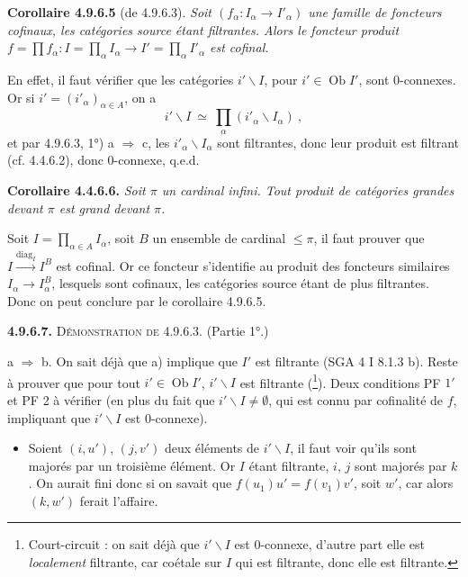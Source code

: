 \documentclass[11pt]{article}
\newcommand{\msp}[1]{\marginpar{\footnotesize [#1]}}
\newcommand{\Ob}{\operatorname{Ob}}
\begin{document}
\textbf{Corollaire 4.9.6.5} (de 4.9.6.3). \textit{Soit $(f_\alpha : I_\alpha \longrightarrow I'_\alpha)$ une famille de foncteurs cofinaux, les catégories source étant filtrantes. Alors le foncteur produit $f = \prod f_\alpha : I = \prod_\alpha I_\alpha \longrightarrow I' = \prod_\alpha I'_\alpha$ est cofinal.}

En effet, il faut vérifier que les catégories $i'\backslash I$, pour $i' \in \Ob I'$, sont 0-connexes. Or si $i' = (i'_\alpha)_{\alpha \in A}$, on a
\[
i'\backslash I \ \simeq \ \prod_\alpha (i'_\alpha\backslash I_\alpha) \ ,
\]
et par 4.9.6.3, 1°) a $\Longrightarrow$ c, les $i'_\alpha\backslash I_\alpha$ sont filtrantes, donc leur produit est filtrant
\msp{page 228}
(cf. 4.4.6.2), donc 0-connexe, q.e.d. %

\textbf{Corollaire 4.4.6.6.} \textit{Soit $\pi$ un cardinal infini. Tout produit de catégories grandes devant $\pi$ est grand devant $\pi$.} %

Soit $I = \prod_{\alpha \in A} I_\alpha$, soit $B$ un ensemble de cardinal $\leqslant \pi$, il faut prouver que $I \xrightarrow{\mathrm{diag}_I} I^B$ est cofinal. Or ce foncteur s'identifie au produit des foncteurs similaires $I_\alpha \longrightarrow I_\alpha^B$, lesquels sont cofinaux, les catégories source étant de plus filtrantes. Donc on peut conclure par le corollaire 4.9.6.5.

\textbf{4.9.6.7.} \textsc{Démonstration de} 4.9.6.3. (Partie 1°.)

a $\Longrightarrow$ b. On sait déjà que a) implique que $I'$ est filtrante (SGA 4 I 8.1.3 b). Reste à prouver que pour tout $i' \in \Ob I'$, $i'\backslash I$ est filtrante (\footnote[103]{Court-circuit : on sait déjà que $i'\backslash I$ est 0-connexe, d'autre part elle est \textit{localement} filtrante, car coétale sur $I$ qui est filtrante, donc elle est filtrante.}). Deux conditions PF $1'$ et PF 2 à vérifier (en plus du fait que $i'\backslash I \neq \emptyset$, qui est connu par cofinalité de $f$, impliquant que $i'\backslash I$ est 0-connexe).
\begin{itemize}[label={}]
\item[1)] Soient $(i,u')$, $(j,v')$ deux éléments de $i'\backslash I$, il faut voir qu'ils sont majorés par un troisième élément. Or $I$ étant filtrante, $i$, $j$ sont majorés par $k$. On aurait fini donc si on savait que $f(u_1)u' = f(v_1)v'$, soit $w'$, car alors $(k,w')$ ferait l'affaire.
\end{itemize}
\end{document}
